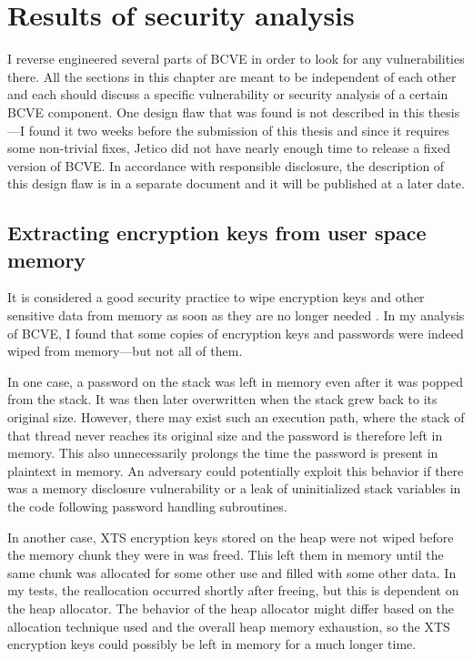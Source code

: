 \documentclass[thesis=B,english]{FITthesis}[2012/10/20]
\begin{document}
	
	\chapter{Results of security analysis}
	\label{ch:fourth}
	
	I reverse engineered several parts of BCVE in order to look for any vulnera\-bilities there. All the sections in this chapter are meant to be independent of each other and each should discuss a specific vulnerability or security analysis of a certain BCVE component. One design flaw that was found is not described in this thesis---I found it two weeks before the submission of this thesis and since it requires some non-trivial fixes, Jetico did not have nearly enough time to release a fixed version of BCVE. In accordance with responsible disclosure, the description of this design flaw is in a separate document and it will be published at a later date.
	
	\section{Extracting encryption keys from user space memory}
	
	It is considered a good security practice to wipe encryption keys and other sensitive data from memory as soon as they are no longer needed \cite{coldboot}. In my analysis of BCVE, I found that some copies of encryption keys and passwords were indeed wiped from memory---but not all of them. 
	
	In one case, a password on the stack was left in memory even after it was popped from the stack. It was then later overwritten when the stack grew back to its original size. However, there may exist such an execution path, where the stack of that thread never reaches its original size and the password is therefore left in memory. This also unnecessarily prolongs the time the password is present in plaintext in memory. An adversary could potentially exploit this behavior if there was a memory disclosure vulnerability or a leak of uninitialized stack variables in the code following password handling subroutines.
	
	In another case, XTS encryption keys stored on the heap were not wiped before the memory chunk they were in was freed. This left them in memory until the same chunk was allocated for some other use and filled with some other data. In my tests, the reallocation occurred shortly after freeing, but this is dependent on the heap allocator. The behavior of the heap allocator might differ based on the allocation technique used and the overall heap memory exhaustion, so the XTS encryption keys could possibly be left in memory for a much longer time.
	
\end{document}
